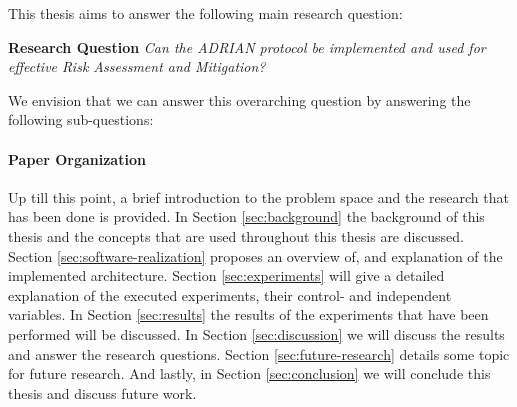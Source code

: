 This thesis aims to answer the following main research question:

\vspace{0.5em}
\noindent\textbf{Research Question}\label{rq} \emph{Can the ADRIAN protocol be implemented and used for effective Risk Assessment and Mitigation?}\vspace{1em}

We envision that we can answer this overarching question by answering the following sub-questions:



\paragraph{Paper Organization}
Up till this point, a brief introduction to the problem space and the research that has been done is provided. In Section \ref{sec:background} the background of this thesis and the concepts that are used throughout this thesis are discussed. Section \ref{sec:software-realization} proposes an overview of, and explanation of the implemented architecture. Section \ref{sec:experiments} will give a detailed explanation of the executed experiments, their control- and independent variables. In Section \ref{sec:results} the results of the experiments that have been performed will be discussed. In Section \ref{sec:discussion} we will discuss the results and answer the research questions. Section \ref{sec:future-research} details some topic for future research. And lastly, in Section \ref{sec:conclusion} we will conclude this thesis and discuss future work.
